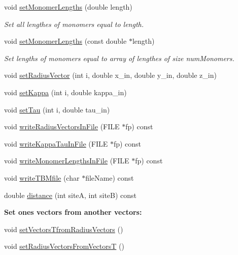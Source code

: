 \begin{DoxyCompactItemize}
void \hyperlink{class_p_c_a_1_1_polymer_a6b1e36cd67148470485df9b99380d8a8}{set\+Monomer\+Lengths} (double length)
\begin{DoxyCompactList}\small\item\em Set all lengthes of monomers equal to length. \end{DoxyCompactList}\item 
void \hyperlink{class_p_c_a_1_1_polymer_a7939514917930c0d2419fd1d0390c889}{set\+Monomer\+Lengths} (const double $\ast$length)
\begin{DoxyCompactList}\small\item\em Set lengths of monomers equal to array of lengthes of size num\+Monomers. \end{DoxyCompactList}\item 
void \hyperlink{class_p_c_a_1_1_polymer_a0c6e93aa35271b98d92a38afd2b0913d}{set\+Radius\+Vector} (int i, double x\+\_\+in, double y\+\_\+in, double z\+\_\+in)
\item 
void \hyperlink{class_p_c_a_1_1_polymer_ac8631ac2842b00802f24478b525c05db}{set\+Kappa} (int i, double kappa\+\_\+in)
\item 
void \hyperlink{class_p_c_a_1_1_polymer_a4ac116507767651444c852a75ab79c2d}{set\+Tau} (int i, double tau\+\_\+in)
\item 
void \hyperlink{class_p_c_a_1_1_polymer_a9859e587476da47e49cfee1152e93fa0}{write\+Radius\+Vectors\+In\+File} (F\+I\+LE $\ast$fp) const
\item 
void \hyperlink{class_p_c_a_1_1_polymer_afa2a326cdf255a2311588e25842dcab5}{write\+Kappa\+Tau\+In\+File} (F\+I\+LE $\ast$fp) const
\item 
void \hyperlink{class_p_c_a_1_1_polymer_a081b8e4d7cac0da6cc411c7b56ff7362}{write\+Monomer\+Lengths\+In\+File} (F\+I\+LE $\ast$fp) const
\item 
void \hyperlink{class_p_c_a_1_1_polymer_ac89188a3e56684ff3313a43ff83abea0}{write\+T\+B\+Mfile} (char $\ast$file\+Name) const
\item 
double \hyperlink{class_p_c_a_1_1_polymer_a901d8c030d3edb333498edcc4502b27a}{distance} (int siteA, int siteB) const
\end{DoxyCompactItemize}
\begin{Indent}{\bf Set ones vectors from another vectors\+:}\par
\begin{DoxyCompactItemize}
\item 
void \hyperlink{class_p_c_a_1_1_polymer_aa655eb1299b272fef8c91f003abbf50d}{set\+Vectors\+Tfrom\+Radius\+Vectors} ()
\item 
void \hyperlink{class_p_c_a_1_1_polymer_a258f607c38c1a247dd37659b236aa3fa}{set\+Radius\+Vectors\+From\+VectorsT} ()
\end{DoxyCompactItemize}
\end{Indent}
